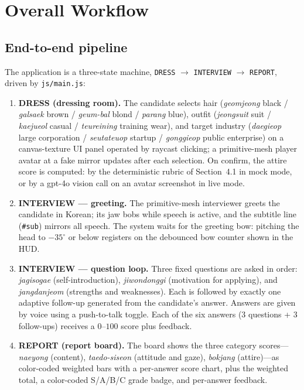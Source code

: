 \documentclass[10pt,a4paper]{article}
\begin{document}
\section{Overall Workflow}
\subsection{End-to-end pipeline}
The application is a three-state machine, \texttt{DRESS} $\rightarrow$ \texttt{INTERVIEW} $\rightarrow$ \texttt{REPORT}, driven by \texttt{js/main.js}:
\begin{enumerate}[leftmargin=1.8em,itemsep=1pt]
  \item \textbf{DRESS (dressing room).} The candidate selects hair (\emph{geomjeong} black / \emph{galsaek} brown / \emph{geum-bal} blond / \emph{parang} blue), outfit (\emph{jeongsuit} suit / \emph{kaejueol} casual / \emph{teureining} training wear), and target industry (\emph{daegieop} large corporation / \emph{seutateuop} startup / \emph{gonggieop} public enterprise) on a canvas-texture UI panel operated by raycast clicking; a primitive-mesh player avatar at a fake mirror updates after each selection. On confirm, the attire score is computed: by the deterministic rubric of Section~4.1 in mock mode, or by a gpt-4o vision call on an avatar screenshot in live mode.
  \item \textbf{INTERVIEW --- greeting.} The primitive-mesh interviewer greets the candidate in Korean; its jaw bobs while speech is active, and the subtitle line (\texttt{\#sub}) mirrors all speech. The system waits for the greeting bow: pitching the head to $-35^\circ$ or below registers on the debounced bow counter shown in the HUD.
  \item \textbf{INTERVIEW --- question loop.} Three fixed questions are asked in order: \emph{jagisogae} (self-introduction), \emph{jiwondonggi} (motivation for applying), and \emph{jangdanjeom} (strengths and weaknesses). Each is followed by exactly one adaptive follow-up generated from the candidate's answer. Answers are given by voice using a push-to-talk toggle. Each of the six answers (3 questions + 3 follow-ups) receives a $0$--$100$ score plus feedback.
  \item \textbf{REPORT (report board).} The board shows the three category scores---\emph{naeyong} (content), \emph{taedo-siseon} (attitude and gaze), \emph{bokjang} (attire)---as color-coded weighted bars with a per-answer score chart, plus the weighted total, a color-coded S/A/B/C grade badge, and per-answer feedback.
\end{enumerate}
\end{document}
